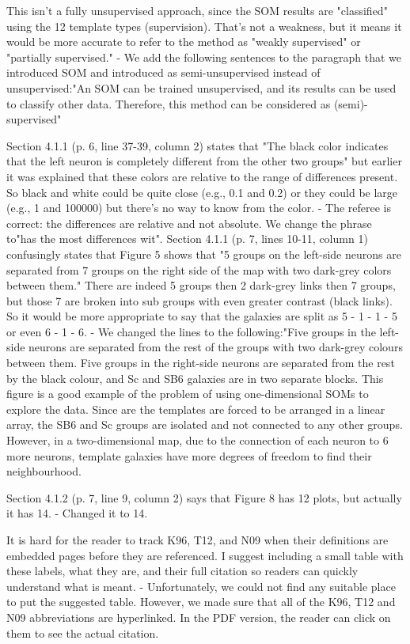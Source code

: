 This isn't a fully unsupervised approach, since the SOM results are "classified" using the 12 template types (supervision).  That's not a weakness, but it means it would be more accurate to refer to the  method as "weakly supervised" or "partially supervised."
-	We add the following sentences to the paragraph that we introduced SOM and introduced as semi-unsupervised instead of unsupervised:"An SOM can be trained unsupervised, and its results can be used to classify other data. Therefore, this method can be considered as (semi)-supervised" 

Section 4.1.1 (p. 6, line 37-39, column 2) states that "The black color indicates that the left neuron is completely different from the other two groups" but earlier it was explained that these colors are relative to the range of differences present.  So black and white could be quite close (e.g., 0.1 and 0.2) or they could be large (e.g., 1 and 100000) but there's no way to know from the color.
-	The referee is correct: the differences are relative and not absolute. We change the phrase to"has the most differences wit". 
Section 4.1.1 (p. 7, lines 10-11, column 1) confusingly states that Figure 5 shows that "5 groups on the left-side neurons are separated from 7 groups on the right side of the map with two dark-grey colors between them."  There are indeed 5 groups then 2 dark-grey links then 7 groups, but those 7 are broken into sub groups with even greater contrast (black links).  So it would be more appropriate to say that the galaxies are split as 5 - 1 - 1 - 5 or even 6 - 1 - 6.
-	We changed the lines to the following:"Five groups in the left-side neurons are separated from the rest of the groups with two dark-grey colours between them. Five groups in the right-side neurons are separated from the rest by the black colour, and Sc and SB6 galaxies are in two separate blocks. This figure is a good example of the problem of using one-dimensional SOMs to explore the data. Since are the templates are forced to be arranged in a linear array, the SB6 and Sc groups are isolated and not connected to any other groups. However, in a two-dimensional map, due to the connection of each neuron to 6 more neurons, template galaxies have more degrees of freedom to find their neighbourhood.

Section 4.1.2 (p. 7, line 9, column 2) says that Figure 8 has 12 plots, but actually it has 14.
-	Changed it to 14.

It is hard for the reader to track K96, T12, and N09 when their definitions are embedded pages before they are referenced.  I suggest including a small table with these labels, what they are, and their full citation so readers can quickly understand what is meant.
-	Unfortunately, we could not find any suitable place to put the suggested table. However, we made sure that all of the K96, T12 and N09 abbreviations are hyperlinked. In the PDF version, the reader can click on them to see the actual citation.

